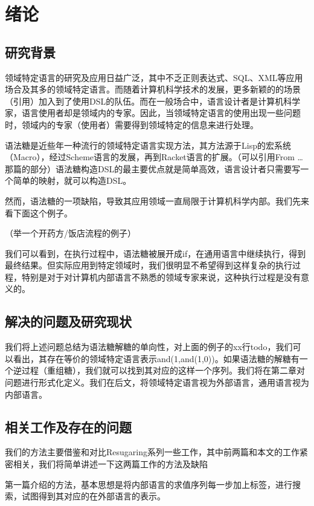 \pagestyle{fancy}
\normalsize
\linespread{1.5}\selectfont
\chapter{绪论}

\section{研究背景}
领域特定语言的研究及应用日益广泛，其中不乏正则表达式、SQL、XML等应用场合及其多的领域特定语言。而随着计算机科学技术的发展，更多新颖的的场景（引用）加入到了使用DSL的队伍。而在一般场合中，语言设计者是计算机科学家，语言使用者却是领域内的专家。因此，当领域特定语言的使用出现一些问题时，领域内的专家（使用者）需要得到领域特定的信息来进行处理。

语法糖是近些年一种流行的领域特定语言实现方法，其方法源于Lisp的宏系统（Macro），经过Scheme语言的发展，再到Racket语言的扩展。（可以引用From …那篇的部分）语法糖构造DSL的最主要优点就是简单高效，语言设计者只需要写一个简单的映射，就可以构造DSL。

然而，语法糖的一项缺陷，导致其应用领域一直局限于计算机科学内部。我们先来看下面这个例子。

（举一个开药方/饭店流程的例子）


我们可以看到，在执行过程中，语法糖被展开成if，在通用语言中继续执行，得到最终结果。但实际应用到特定领域时，我们很明显不希望得到这样复杂的执行过程，特别是对于对计算机内部语言不熟悉的领域专家来说，这种执行过程是没有意义的。

\section{解决的问题及研究现状}
我们将上述问题总结为语法糖解糖的单向性，对上面的例子的xx行todo，我们可以看出，其存在等价的领域特定语言表示and(1,and(1,0))。如果语法糖的解糖有一个逆过程（重组糖），我们就可以找到其对应的这样一个序列。我们将在第二章对问题进行形式化定义。我们在后文，将领域特定语言视为外部语言，通用语言视为内部语言。

\section{相关工作及存在的问题}
我们的方法主要借鉴和对比Resugaring系列一些工作，其中前两篇和本文的工作紧密相关，我们将简单讲述一下这两篇工作的方法及缺陷

第一篇介绍的方法，基本思想是将内部语言的求值序列每一步加上标签，进行搜索，试图得到其对应的在外部语言的表示。

